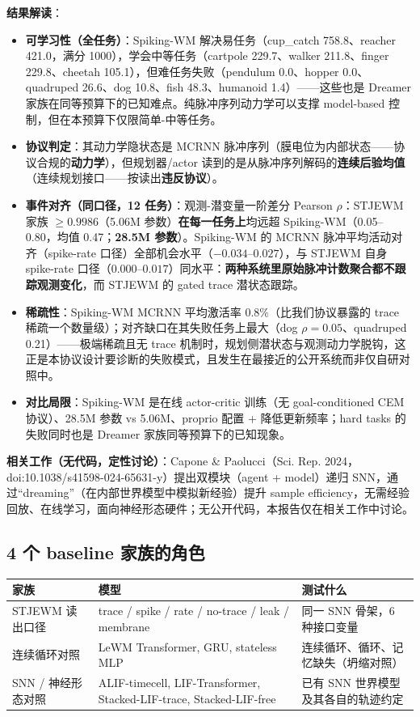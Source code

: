 \documentclass[11pt,a4paper]{article}
\begin{document}
\textbf{结果解读}：
\begin{itemize}[leftmargin=2em]
    \item \textbf{可学习性（全任务）}：Spiking-WM 解决易任务（cup\_catch 758.8、reacher 421.0，满分 1000），学会中等任务（cartpole 229.7、walker 211.8、finger 229.8、cheetah 105.1），但难任务失败（pendulum 0.0、hopper 0.0、quadruped 26.6、dog 10.8、fish 48.3、humanoid 1.4）——这些也是 Dreamer 家族在同等预算下的已知难点。纯脉冲序列动力学可以支撑 model-based 控制，但在本预算下仅限简单-中等任务。
    \item \textbf{协议判定}：其动力学隐状态是 MCRNN 脉冲序列（膜电位为内部状态——协议合规的\textbf{动力学}），但规划器/actor 读到的是从脉冲序列解码的\textbf{连续后验均值}（连续规划接口——按读出\textbf{违反协议}）。
    \item \textbf{事件对齐（同口径，12 任务）}：观测-潜变量一阶差分 Pearson $\rho$：STJEWM 家族 $\geq 0.9986$（5.06M 参数）\textbf{在每一任务上}均远超 Spiking-WM（0.05--0.80，均值 0.47；\textbf{28.5M 参数}）。Spiking-WM 的 MCRNN 脉冲平均活动对齐（spike-rate 口径）全部机会水平（$-0.034$--$0.027$），与 STJEWM 自身 spike-rate 口径（$0.000$--$0.017$）同水平：\textbf{两种系统里原始脉冲计数聚合都不跟踪观测变化}，而 STJEWM 的 gated trace 潜状态跟踪。
    \item \textbf{稀疏性}：Spiking-WM MCRNN 平均激活率 $0.8\%$（比我们协议暴露的 trace 稀疏一个数量级）；对齐缺口在其失败任务上最大（dog $\rho=0.05$、quadruped 0.21）——极端稀疏且无 trace 机制时，规划侧潜状态与观测动力学脱钩，这正是本协议设计要诊断的失败模式，且发生在最接近的公开系统而非仅自研对照中。
    \item \textbf{对比局限}：Spiking-WM 是在线 actor-critic 训练（无 goal-conditioned CEM 协议）、28.5M 参数 vs 5.06M、proprio 配置 + 降低更新频率；hard tasks 的失败同时也是 Dreamer 家族同等预算下的已知现象。
\end{itemize}

\textbf{相关工作（无代码，定性讨论）}：Capone \& Paolucci（Sci. Rep. 2024，doi:10.1038/s41598-024-65631-y）提出双模块（agent + model）递归 SNN，通过“dreaming”（在内部世界模型中模拟新经验）提升 sample efficiency，无需经验回放、在线学习，面向神经形态硬件；无公开代码，本报告仅在相关工作中讨论。

\subsection{4 个 baseline 家族的角色}

\begin{longtable}{p{}p{}p{}}
\toprule
\textbf{家族} & \textbf{模型} & \textbf{测试什么} \\
\midrule
STJEWM 读出口径 & trace / spike / rate / no-trace / leak / membrane & 同一 SNN 骨架，6 种接口变量 \\
连续循环对照 & LeWM Transformer, GRU, stateless MLP & 连续循环、循环、记忆缺失（坍缩对照） \\
SNN / 神经形态对照 & ALIF-timecell, LIF-Transformer, Stacked-LIF-trace, Stacked-LIF-free & 已有 SNN 世界模型及其各自的轨迹约定 \\
\bottomrule
\end{longtable}
\end{document}
